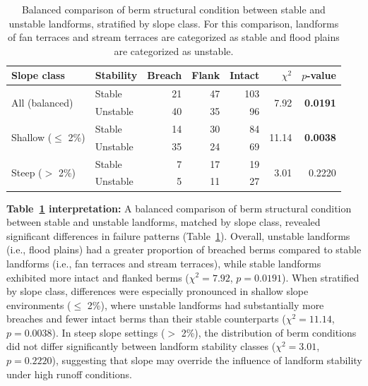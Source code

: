 \documentclass[review]{elsarticle}
\begin{document}
\begin{table}[h!]
\centering
\caption{\normalsize Balanced comparison of berm structural condition between stable and unstable landforms, stratified by slope class. For this comparison, landforms of fan terraces and stream terraces are categorized as stable and flood plains are categorized as unstable.}
\small
\begin{tabular}{|l|l|r|r|r|r|r|}
\hline
\textbf{Slope class} & \textbf{Stability} & \textbf{Breach} & \textbf{Flank} & \textbf{Intact} & \textbf{$\chi^2$} & \textbf{$p$-value} \\
\hline
\multirow{2}{*}{All (balanced)} & Stable & 21 & 47 & 103 & \multirow{2}{*}{7.92} & \multirow{2}{*}{\textbf{0.0191}} \\
& Unstable & 40 & 35 & 96 & & \\
\hline
\multirow{2}{*}{Shallow ($\leq$ 2\%)} & Stable & 14 & 30 & 84 & \multirow{2}{*}{11.14} & \multirow{2}{*}{\textbf{0.0038}} \\
& Unstable & 35 & 24 & 69 & & \\
\hline
\multirow{2}{*}{Steep ($>$ 2\%)} & Stable & 7 & 17 & 19 & \multirow{2}{*}{3.01} & \multirow{2}{*}{0.2220} \\
& Unstable & 5 & 11 & 27 & & \\
\hline
\end{tabular}
\label{tab:stability_slope_chi}
\end{table}

\textbf{Table~\ref{tab:stability_slope_chi} interpretation:} A balanced comparison of berm structural condition between stable and unstable landforms, matched by slope class, revealed significant differences in failure patterns (Table~\ref{tab:stability_slope_chi}). Overall, unstable landforms (i.e., flood plains) had a greater proportion of breached berms compared to stable landforms (i.e., fan terraces and stream terraces), while stable landforms exhibited more intact and flanked berms ($\chi^2 = 7.92$, $p = 0.0191$). When stratified by slope class, differences were especially pronounced in shallow slope environments ($\leq$ 2\%), where unstable landforms had substantially more breaches and fewer intact berms than their stable counterparts ($\chi^2 = 11.14$, $p = 0.0038$). In steep slope settings ($>$ 2\%), the distribution of berm conditions did not differ significantly between landform stability classes ($\chi^2 = 3.01$, $p = 0.2220$), suggesting that slope may override the influence of landform stability under high runoff conditions.
\end{document}
